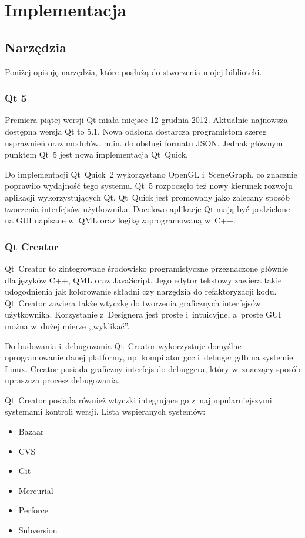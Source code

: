 \chapter{Implementacja}

\section{Narzędzia}
Poniżej opisuję narzędzia, które posłużą do stworzenia mojej biblioteki.

\subsection{Qt 5}
Premiera piątej wersji Qt miała miejsce 12 grudnia 2012. Aktualnie najnowsza dostępna wersja Qt to 5.1. Nowa odsłona dostarcza programistom szereg usprawnień oraz modułów, m.in. do obsługi formatu JSON. Jednak głównym punktem Qt~5 jest nowa implementacja Qt~Quick. 

Do implementacji Qt~Quick~2 wykorzystano OpenGL i~SceneGraph, co znacznie poprawiło wydajność tego systemu. Qt~5 rozpoczęło też nowy kierunek rozwoju aplikacji wykorzystujących Qt. Qt~Quick jest promowany jako zalecany sposób tworzenia interfejsów użytkownika. Docelowo aplikacje Qt mają być podzielone na GUI napisane w~QML oraz logikę zaprogramowaną w~C++.

\subsection{Qt Creator}
Qt~Creator to zintegrowane środowisko programistyczne przeznaczone głównie dla języków C++, QML oraz JavaScript. Jego edytor tekstowy zawiera takie udogodnienia jak kolorowanie składni czy narzędzia do refaktoryzacji kodu. Qt~Creator zawiera także wtyczkę do tworzenia graficznych interfejsów użytkownika. Korzystanie z~Designera jest proste i~intuicyjne, a~proste GUI można w~dużej mierze ,,wyklikać''.

Do budowania i~debugowania Qt~Creator wykorzystuje domyślne oprogramowanie danej platformy, np. kompilator gcc i~debuger gdb na systemie Linux. Creator posiada graficzny interfejs do debuggera, który w~znaczący sposób upraszcza procesz debugowania.

Qt~Creator posiada również wtyczki integrujące go z~najpopularniejszymi systemami kontroli wersji. Lista wspieranych systemów:
\begin{itemize}
\item{Bazaar}
\item{CVS}
\item{Git}
\item{Mercurial}
\item{Perforce}
\item{Subversion}
\end{itemize}

